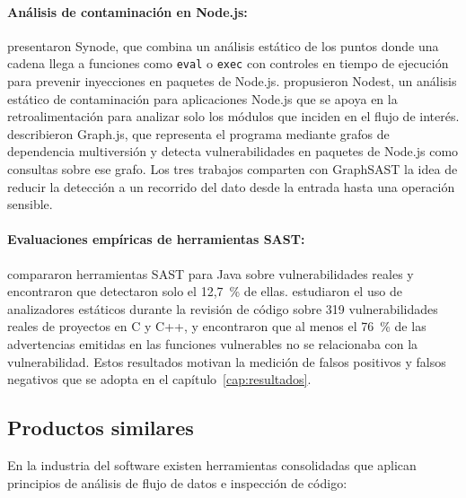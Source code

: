 \paragraph{Análisis de contaminación en Node.js:} \citet{staicu2018} presentaron Synode, que combina un análisis estático de los puntos donde una cadena llega a funciones como \texttt{eval} o \texttt{exec} con controles en tiempo de ejecución para prevenir inyecciones en paquetes de Node.js. \citet{nielsen2019} propusieron Nodest, un análisis estático de contaminación para aplicaciones Node.js que se apoya en la retroalimentación para analizar solo los módulos que inciden en el flujo de interés. \citet{ferreira2024} describieron Graph.js, que representa el programa mediante grafos de dependencia multiversión y detecta vulnerabilidades en paquetes de Node.js como consultas sobre ese grafo. Los tres trabajos comparten con GraphSAST la idea de reducir la detección a un recorrido del dato desde la entrada hasta una operación sensible.

\paragraph{Evaluaciones empíricas de herramientas SAST:} \citet{likaixuan2023} compararon herramientas SAST para Java sobre vulnerabilidades reales y encontraron que detectaron solo el 12,7~\% de ellas. \citet{charoenwet2024} estudiaron el uso de analizadores estáticos durante la revisión de código sobre 319 vulnerabilidades reales de proyectos en C y C++, y encontraron que al menos el 76~\% de las advertencias emitidas en las funciones vulnerables no se relacionaba con la vulnerabilidad. Estos resultados motivan la medición de falsos positivos y falsos negativos que se adopta en el capítulo~\ref{cap:resultados}.

\subsection{Productos similares}\label{sec:n3.1.4}

En la industria del software existen herramientas consolidadas que aplican principios de análisis de flujo de datos e inspección de código:

